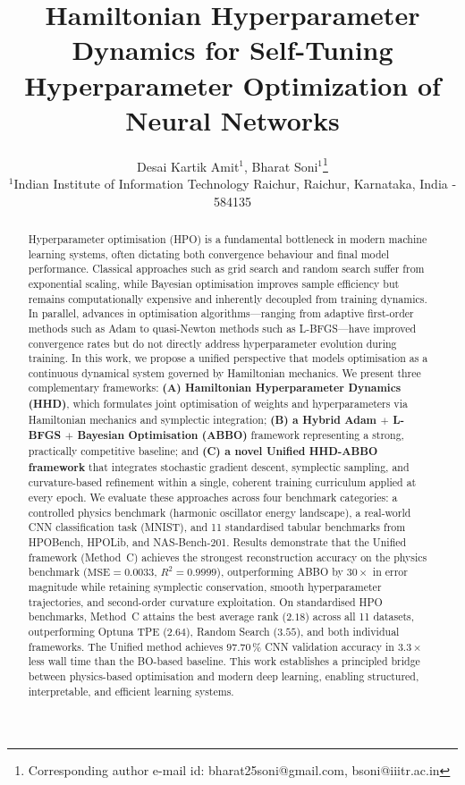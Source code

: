 \documentclass[11pt]{article}
\begin{document}
\title{Hamiltonian Hyperparameter Dynamics for Self-Tuning Hyperparameter Optimization of Neural Networks} %
	\author {Desai Kartik Amit$^{1}$, Bharat Soni$^{1}$\thanks{Corresponding author e-mail id: bharat25soni@gmail.com, bsoni@iiitr.ac.in}
        \\ $^1$Indian Institute of Information Technology Raichur, Raichur, Karnataka, India - 584135
	}
	\date{}
	\maketitle

\begin{abstract}
Hyperparameter optimisation (HPO) is a fundamental bottleneck in
modern machine learning systems, often dictating both convergence
behaviour and final model performance.  Classical approaches such as
grid search and random search suffer from exponential scaling, while
Bayesian optimisation improves sample efficiency but remains
computationally expensive and inherently decoupled from training
dynamics.  In parallel, advances in optimisation algorithms—ranging
from adaptive first-order methods such as Adam to quasi-Newton methods
such as L-BFGS—have improved convergence rates but do not directly
address hyperparameter evolution during training.
In this work, we propose a unified perspective that models optimisation
as a continuous dynamical system governed by Hamiltonian mechanics.  We
present three complementary frameworks: \textbf{(A) Hamiltonian
Hyperparameter Dynamics (HHD)}, which formulates joint optimisation of
weights and hyperparameters via Hamiltonian mechanics and symplectic
integration; \textbf{(B) a Hybrid Adam $+$ L-BFGS $+$ Bayesian
Optimisation (ABBO)} framework representing a strong, practically
competitive baseline; and \textbf{(C) a novel Unified HHD-ABBO
framework} that integrates stochastic gradient descent, symplectic
sampling, and curvature-based refinement within a single, coherent
training curriculum applied at every epoch.
We evaluate these approaches across four benchmark categories: a
controlled physics benchmark (harmonic oscillator energy landscape),
a real-world CNN classification task (MNIST), and 11 standardised
tabular benchmarks from HPOBench, HPOLib, and NAS-Bench-201.  Results
demonstrate that the Unified framework (Method~C) achieves the
strongest reconstruction accuracy on the physics benchmark
($\mathrm{MSE} = 0.0033$, $R^2 = 0.9999$), outperforming ABBO by
$30\times$ in error magnitude while retaining symplectic conservation,
smooth hyperparameter trajectories, and second-order curvature
exploitation.  On standardised HPO benchmarks, Method~C attains the
best average rank ($2.18$) across all 11 datasets, outperforming
Optuna TPE ($2.64$), Random Search ($3.55$), and both individual
frameworks.  The Unified method achieves $97.70\,\%$ CNN validation
accuracy in $3.3\times$ less wall time than the BO-based baseline.
This work establishes a principled bridge between physics-based
optimisation and modern deep learning, enabling structured,
interpretable, and efficient learning systems.
\end{abstract}
\end{document}

